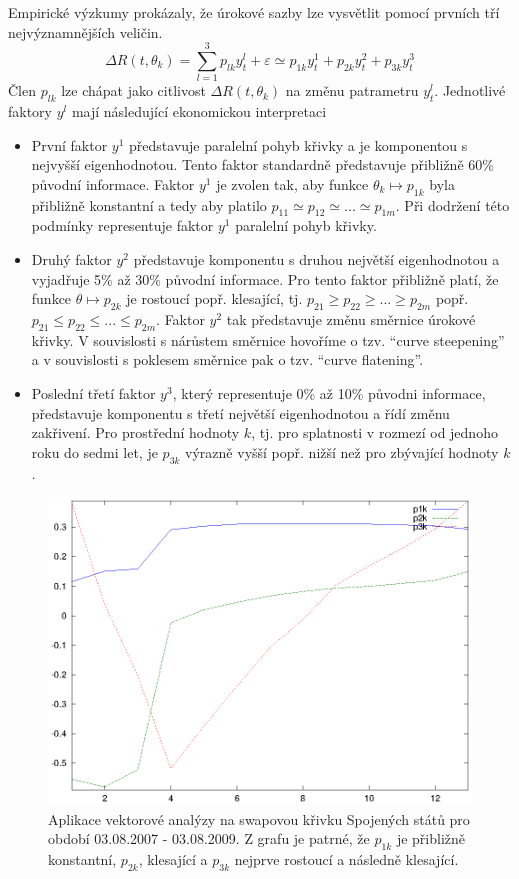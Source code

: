 \documentclass[a4paper]{book}
\begin{document}
Empirické výzkumy prokázaly, že úrokové sazby lze vysvětlit pomocí prvních tří nejvýznamnějších veličin.
\begin{equation*}
\Delta R(t, \theta_k) = \sum_{l = 1}^3 p_{lk}y_t^l + \varepsilon \simeq p_{1k}y_t^1 + p_{2k}y_t^2 + p_{3k}y_t^3
\end{equation*}
Člen $p_{lk}$ lze chápat jako citlivost $\Delta R(t, \theta_k)$ na změnu patrametru $y_t^l$. Jednotlivé faktory $y^l$ mají následující ekonomickou interpretaci
\begin{itemize}
\item První faktor $y^1$ představuje paralelní pohyb křivky a je komponentou s nejvyšší eigenhodnotou. Tento faktor standardně představuje přibližně 60\% původní informace. Faktor $y^1$ je zvolen tak, aby funkce $\theta_k \longmapsto p_{1k}$ byla přibližně konstantní a tedy aby platilo $p_{11} \simeq p_{12} \simeq ... \simeq p_{1m}$. Při dodržení této podmínky representuje faktor $y^1$ paralelní pohyb křivky.
\item Druhý faktor $y^2$ představuje komponentu s druhou největší eigenhodnotou a vyjadřuje 5\% až 30\% původní informace. Pro tento faktor přibližně platí, že funkce $\theta \longmapsto p_{2k}$ je rostoucí popř. klesající, tj. $p_{21} \ge p_{22} \ge ... \ge p_{2m}$ popř. $p_{21} \le p_{22} \le ... \le p_{2m}$. Faktor $y^2$ tak představuje změnu směrnice úrokové křivky. V souvislosti s nárůstem směrnice hovoříme o tzv. ``curve steepening'' a v souvislosti s poklesem směrnice pak o tzv. ``curve flatening''.
\item Poslední třetí faktor $y^3$, který representuje 0\% až 10\% původni informace, představuje komponentu s třetí největší eigenhodnotou a řídí změnu zakřivení. Pro prostřední hodnoty $k$, tj. pro splatnosti v rozmezí od jednoho roku do sedmi let, je $p_{3k}$ výrazně vyšší popř. nižší než pro zbývající hodnoty $k$.
\end{itemize}
\begin{figure}
  \centering
  \includegraphics[scale=0.75]{components.eps}
  \caption{Aplikace vektorové analýzy na swapovou křivku Spojených států pro období 03.08.2007 - 03.08.2009. Z grafu je patrné, že $p_{1k}$ je přibližně konstantní, $p_{2k}$, klesající a $p_{3k}$ nejprve rostoucí a následně klesající.}
  \label{components}
\end{figure}
\end{document}
